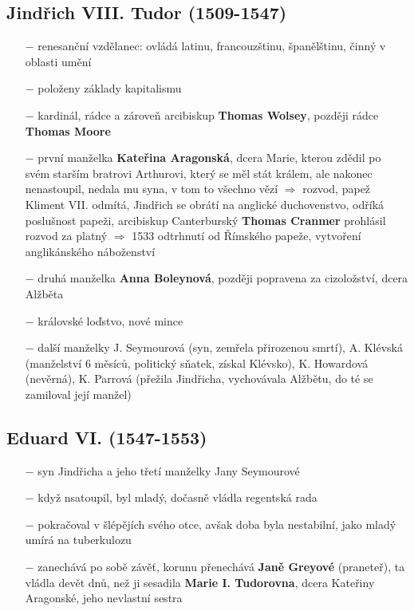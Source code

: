 \documentclass{article}
\begin{document}
\subsection*{Jindřich VIII. Tudor (1509-1547)}
\begin{itemize}
    \vspace{-0.5em}
    \setlength\itemsep{0.15em}
    \item[$-$] renesanční vzdělanec: ovládá latinu, francouzštinu, španělštinu, činný v oblasti umění
    \item[$-$] položeny základy kapitalismu
    \item[$-$] kardinál, rádce a zároveň arcibiskup \textbf{Thomas Wolsey}, později rádce \textbf{Thomas Moore}
    \item[$-$] první manželka \textbf{Kateřina Aragonská}, dcera Marie, kterou zdědil po svém starším bratrovi Arthurovi, který se měl stát králem, ale nakonec nenastoupil, nedala mu syna, v tom to všechno vězí $\Rightarrow$ rozvod, papež Kliment VII. odmítá, Jindřich se obrátí na anglické duchovenstvo, odříká poslušnost papeži, arcibiskup Canterburský \textbf{Thomas Cranmer} prohlásil rozvod za platný $\Rightarrow$ 1533 odtrhnutí od Římského papeže, vytvoření anglikánského náboženství
    \item[$-$] druhá manželka \textbf{Anna Boleynová}, později popravena za cizoložství, dcera Alžběta
    \item[$-$] královské loďstvo, nové mince
    \item[$-$] další manželky J. Seymourová (syn, zemřela přirozenou smrtí), A. Klévská (manželství 6 měsíců, politický sňatek, získal Klévsko), K. Howardová (nevěrná), K. Parrová (přežila Jindřicha, vychovávala Alžbětu, do té se zamiloval její manžel)
\end{itemize}

\subsection*{Eduard VI. (1547-1553)}
\begin{itemize}
    \vspace{-0.5em}
    \setlength\itemsep{0.15em}
    \item[$-$] syn Jindřicha a jeho třetí manželky Jany Seymourové
    \item[$-$] když nsatoupil, byl mladý, dočasně vládla regentská rada
    \item[$-$] pokračoval v šlépějích svého otce, avšak doba byla nestabilní, jako mladý umírá na tuberkulozu
    \item[$-$] zanechává po sobě závěť, korunu přenechává \textbf{Janě Greyové} (praneteř), ta vládla devět dnů, než ji sesadila \textbf{Marie I. Tudorovna}, dcera Kateřiny Aragonské, jeho nevlastní sestra

\end{itemize}
\end{document}
